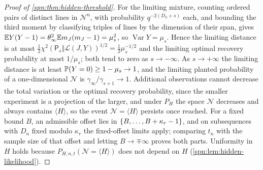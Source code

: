 \begin{proof}[Proof of \cref{spn:thm:hidden-threshold}]
For the limiting mixture, counting ordered pairs of distinct lines in $\mathcal N^{\mathrm u}$, with
probability $q^{-2(D_n+s)}$ each, and bounding the third moment by classifying triples of lines by the
dimension of their span, gives $\mathbb{E} Y(Y-1)=\theta_\infty^2\mathbb{E} m_J(m_J-1)=\mu_s^2$, so
$\operatorname{Var}Y=\mu_s$. Hence the limiting distance is at most
$\frac12\chi^2(\mathsf P_s\Vert\mathcal L(J,Y))^{1/2}=\frac12\mu_s^{-1/2}$ and the limiting optimal recovery
probability at most $1/\mu_s$; both tend to zero as $s\to-\infty$. As $s\to+\infty$ the limiting
distance is at least $\mathbb{P}(Y=0)\ge1-\mu_s\to1$, and the limiting planted probability of a
one-dimensional $\mathcal N$ is $\gamma_\infty/\gamma_{s+1}\to1$. Additional observations cannot
decrease the total variation or the optimal recovery probability, since the smaller experiment is a
projection of the larger, and under $P_{H}$ the space $\mathcal N$ decreases and always contains
$\langle H\rangle$, so the event $\mathcal N=\langle H\rangle$ persists once reached. For a fixed bound
$B$, an admissible offset lies in $\{B,\dots,B+\kappa_r-1\}$, and on subsequences with $D_n$ fixed
modulo $\kappa_r$ the fixed-offset limits apply; comparing $t_n$ with the sample size of that offset and
letting $B\to\mp\infty$ proves both parts. Uniformity in $H$ holds because
$P_{H,n,t}(\mathcal N=\langle H\rangle)$ does not depend on $H$ (\cref{spn:lem:hidden-likelihood}).
\end{proof}


